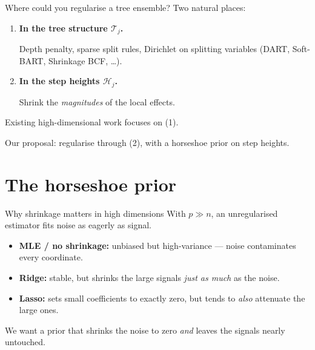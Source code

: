\documentclass[10pt,aspectratio=169]{beamer}
\newcommand{\T}{\mathcal{T}}
\newcommand{\Hh}{\mathcal{H}}
\begin{document}
\begin{frame}{Where could you regularise a tree ensemble?}
Two natural places:

\bigskip

\begin{enumerate}
  \item \textbf{In the tree structure $\T_j$.}
  \medskip

  Depth penalty, sparse split rules, Dirichlet on splitting variables (DART, Soft-BART, Shrinkage BCF, \ldots).
  \medskip

  \item \textbf{In the step heights $\Hh_j$.}
  \medskip

  Shrink the \emph{magnitudes} of the local effects.
\end{enumerate}

\bigskip

Existing high-dimensional work focuses on (1).
\medskip

\alert{Our proposal: regularise through (2), with a horseshoe prior on step heights.}
\end{frame}

\section{The horseshoe prior}

\begin{frame}{Why shrinkage matters in high dimensions}
With $p \gg n$, an unregularised estimator fits noise as eagerly as signal.

\bigskip

\centering
{}

\vspace{0.4cm}
\begin{itemize}
  \item \textbf{MLE / no shrinkage:} unbiased but high-variance — noise contaminates every coordinate.
  \item \textbf{Ridge:} stable, but shrinks the large signals \emph{just as much} as the noise.
  \item \textbf{Lasso:} sets small coefficients to exactly zero, but tends to \emph{also} attenuate the large ones.
\end{itemize}

\medskip
\alert{We want a prior that shrinks the noise to zero \emph{and} leaves the signals nearly untouched.}
\end{frame}
\end{document}

